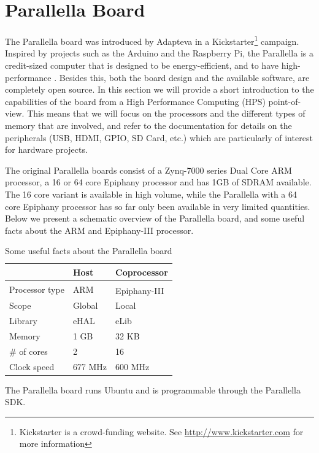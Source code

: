 \documentclass[fleqn]{article}
\renewcommand{\(}{\left(}
\renewcommand{\)}{\right)}
\newcommand{\tm}{\textsuperscript{\texttrademark}}
\begin{document}
\section{Parallella Board}

The Parallella board was introduced by Adapteva in a Kickstarter\footnote{Kickstarter is a crowd-funding website. See \url{http://www.kickstarter.com} for more information} campaign. Inspired by projects such as the Arduino and the Raspberry Pi, the Parallella is a credit-sized computer that is designed to be energy-efficient, and to have high-performance \cite{par:manual}. Besides this, both the board design and the available software, are completely open source. In this section we will provide a short introduction to the capabilities of the board from a High Performance Computing (HPS) point-of-view. This means that we will focus on the processors and the different types of memory that are involved, and refer to the documentation for details on the peripherals (USB, HDMI, GPIO, SD Card, etc.) which are particularly of interest for hardware projects. 

The original Parallella boards consist of a Zynq-7000 series Dual Core ARM processor, a 16 or 64 core Epiphany processor and has 1GB of SDRAM available. The 16 core variant is available in high volume, while the Parallella with a 64 core Epiphany processor has so far only been available in very limited quantities. Below we present a schematic overview of the Parallella board, and some useful facts about the ARM and Epiphany-III processor.

\begin{table}[h]
\centering
\begin{tabular}{l|ll}
& Host & Coprocessor \\
\hline
Processor type & ARM & Epiphany-III\tm \\
Scope & Global & Local \\
Library & eHAL & eLib \\
Memory & 1 GB & 32 KB \\
\# of cores & 2 & 16 \\
Clock speed & 677 MHz & 600 MHz\\

\end{tabular}
\caption{Some useful facts about the Parallella board}
\end{table}




The Parallella board runs Ubuntu and is programmable through the Parallella SDK.
\end{document}
